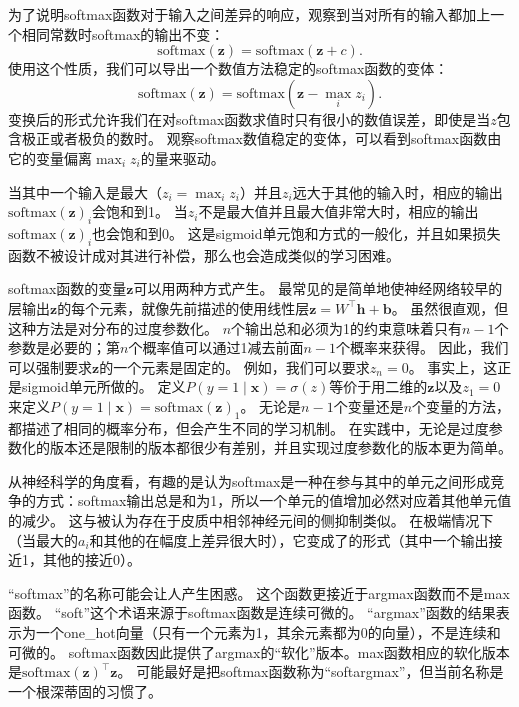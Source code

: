 
为了说明softmax函数对于输入之间差异的响应，观察到当对所有的输入都加上一个相同常数时softmax的输出不变：
\begin{equation}
\text{softmax}(\bm{z}) = \text{softmax}(\bm{z}+c).
\end{equation}
使用这个性质，我们可以导出一个数值方法稳定的softmax函数的变体：
\begin{equation}
\text{softmax}(\bm{z}) = \text{softmax}(\bm{z}- \max_i z_i).
\end{equation}
变换后的形式允许我们在对softmax函数求值时只有很小的数值误差，即使是当$z$包含极正或者极负的数时。
观察softmax数值稳定的变体，可以看到softmax函数由它的变量偏离$\max_i z_i$的量来驱动。

当其中一个输入是最大（$z_i = \max_i z_i$）并且$z_i$远大于其他的输入时，相应的输出$\text{softmax}(\bm{z})_i$会饱和到1。
当$z_i$不是最大值并且最大值非常大时，相应的输出$\text{softmax}(\bm{z})_i$也会饱和到0。
这是sigmoid单元饱和方式的一般化，并且如果损失函数不被设计成对其进行补偿，那么也会造成类似的学习困难。

softmax函数的变量$\bm{z}$可以用两种方式产生。
最常见的是简单地使神经网络较早的层输出$\bm{z}$的每个元素，就像先前描述的使用线性层$\bm{z}={W}^\top\bm{h}+\bm{b}$。
虽然很直观，但这种方法是对分布的过度参数化。
$n$个输出总和必须为1的约束意味着只有$n-1$个参数是必要的；第$n$个概率值可以通过1减去前面$n-1$个概率来获得。
因此，我们可以强制要求$\bm{z}$的一个元素是固定的。
例如，我们可以要求$z_n=0$。
事实上，这正是sigmoid单元所做的。
定义$P(y=1\mid\bm{x})=\sigma(z)$等价于用二维的$\bm{z}$以及$z_1=0$来定义$P(y=1\mid\bm{x})=\text{softmax}(\bm{z})_1$。
无论是$n-1$个变量还是$n$个变量的方法，都描述了相同的概率分布，但会产生不同的学习机制。
在实践中，无论是过度参数化的版本还是限制的版本都很少有差别，并且实现过度参数化的版本更为简单。

从神经科学的角度看，有趣的是认为softmax是一种在参与其中的单元之间形成竞争的方式：softmax输出总是和为1，所以一个单元的值增加必然对应着其他单元值的减少。
这与被认为存在于皮质中相邻神经元间的侧抑制类似。
在极端情况下（当最大的$a_i$和其他的在幅度上差异很大时），它变成了的形式（其中一个输出接近1，其他的接近0）。

``softmax''的名称可能会让人产生困惑。
这个函数更接近于argmax函数而不是max函数。
``soft''这个术语来源于softmax函数是连续可微的。
``argmax''函数的结果表示为一个\gls{one_hot}向量（只有一个元素为1，其余元素都为0的向量），不是连续和可微的。
softmax函数因此提供了argmax的``软化''版本。max函数相应的软化版本是$\text{softmax}(\bm{z})^\top \bm{z}$。
可能最好是把softmax函数称为``softargmax''，但当前名称是一个根深蒂固的习惯了。

